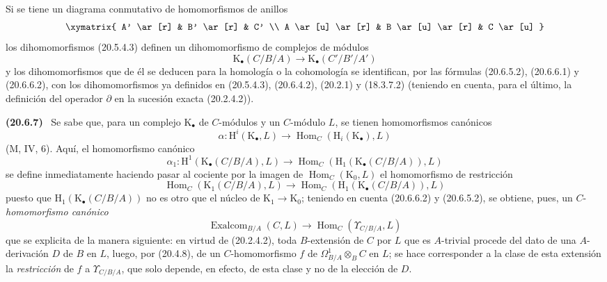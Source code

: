 \documentclass[10pt,oneside]{book}
\makeatletter
\newcommand{\setmanualcurrentlabel}[1]{\def\@currentlabel{#1}}
\newenvironment{env}[1][]{\setmanualcurrentlabel{#1}\par\medskip\noindent\textbf{(#1)}\ }{\par}
\makeatother
\begin{document}
Si se tiene un diagrama conmutativo de homomorfismos de anillos
\[
\xymatrix{
  A' \ar[r] & B' \ar[r] & C' \\
  A \ar[u] \ar[r] & B \ar[u] \ar[r] & C \ar[u]
}
\]
los dihomomorfismos (20.5.4.3) definen un dihomomorfismo de
complejos de módulos
\begin{equation}
\tag{20.6.6.4}
\label{0.20.6.6.4-es}
  \mathrm{K}_\bullet(C/B/A)\longrightarrow
  \mathrm{K}_\bullet(C'/B'/A')
\end{equation}
y los dihomomorfismos que de él se deducen para la homología o la
cohomología se identifican, por las fórmulas (20.6.5.2), (20.6.6.1) y
(20.6.6.2), con los dihomomorfismos ya definidos en (20.5.4.3),
(20.6.4.2), (20.2.1) y (18.3.7.2) (teniendo en cuenta, para el último, la
definición del operador $\partial$ en la sucesión exacta (20.2.4.2)).

\begin{env}[20.6.7]
\label{0.20.6.7-es}
Se sabe que, para un complejo $\mathrm{K}_\bullet$ de $C$-módulos y un
$C$-módulo $L$, se tienen homomorfismos canónicos
\[
  \alpha:\mathrm{H}^i(\mathrm{K}_\bullet,L)\longrightarrow
  \operatorname{Hom}_C(\mathrm{H}_i(\mathrm{K}_\bullet),L)
\]
(M, IV, 6). Aquí, el homomorfismo canónico
\[
  \alpha_1:\mathrm{H}^1(\mathrm{K}_\bullet(C/B/A),L)
  \longrightarrow
  \operatorname{Hom}_C(\mathrm{H}_1(\mathrm{K}_\bullet(C/B/A)),L)
\]
se define inmediatamente haciendo pasar al cociente por la imagen
de $\operatorname{Hom}_C(\mathrm{K}_0,L)$ el homomorfismo de restricción
\[
  \operatorname{Hom}_C(\mathrm{K}_1(C/B/A),L)\longrightarrow
  \operatorname{Hom}_C(\mathrm{H}_1(\mathrm{K}_\bullet(C/B/A)),L)
\]
puesto que $\mathrm{H}_1(\mathrm{K}_\bullet(C/B/A))$ no es otro que el
núcleo de $\mathrm{K}_1\to\mathrm{K}_0$; teniendo en cuenta (20.6.6.2) y
(20.6.5.2), se obtiene, pues, un $C$-\emph{homomorfismo canónico}
\begin{equation}
\tag{20.6.7.1}
\label{0.20.6.7.1-es}
  \operatorname{Exalcom}_{B/A}(C,L)\longrightarrow
  \operatorname{Hom}_C(\Upsilon_{C/B/A},L)
\end{equation}
que se explicita de la manera siguiente: en virtud de (20.2.4.2), toda
$B$-extensión de $C$ por $L$ que es $A$-trivial procede del dato
de una $A$-derivación $D$ de $B$ en $L$, luego, por (20.4.8), de un
$C$-homomorfismo $f$ de $\Omega^1_{B/A}\otimes_B C$ en $L$; se hace
corresponder a la clase de esta extensión la \emph{restricción} de $f$
a $\Upsilon_{C/B/A}$, que solo depende, en efecto, de esta clase y
no de la elección de $D$.
\end{env}
\end{document}
